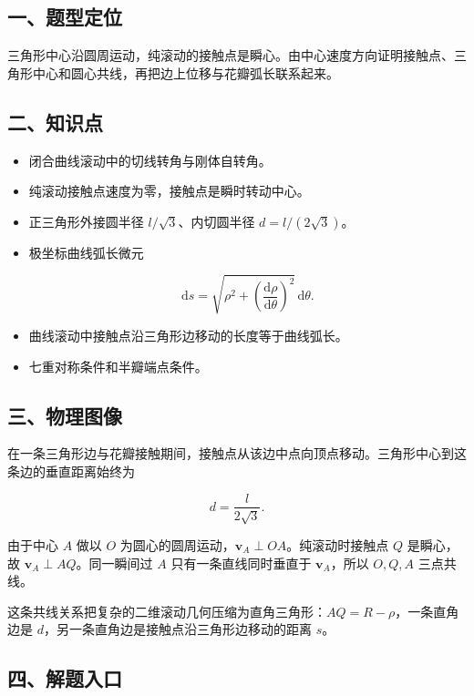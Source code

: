 \documentclass[12pt,a4paper,UTF8]{ctexart}
\begin{document}
\subsection{一、题型定位}\label{ux4e00ux9898ux578bux5b9aux4f4d-1}

三角形中心沿圆周运动，纯滚动的接触点是瞬心。由中心速度方向证明接触点、三角形中心和圆心共线，再把边上位移与花瓣弧长联系起来。

\subsection{二、知识点}\label{ux4e8cux77e5ux8bc6ux70b9-1}

\begin{itemize}
\item
  闭合曲线滚动中的切线转角与刚体自转角。
\item
  纯滚动接触点速度为零，接触点是瞬时转动中心。
\item
  正三角形外接圆半径 \(l/\sqrt3\)、内切圆半径 \(d=l/(2\sqrt3)\)。
\item
  极坐标曲线弧长微元

  \[\mathrm{d}s=\sqrt{\rho^2+\left(\frac{\mathrm{d}\rho}{\mathrm{d}\theta}\right)^2}\,\mathrm{d}\theta.\]
\item
  曲线滚动中接触点沿三角形边移动的长度等于曲线弧长。
\item
  七重对称条件和半瓣端点条件。
\end{itemize}

\subsection{三、物理图像}\label{ux4e09ux7269ux7406ux56feux50cf-1}

在一条三角形边与花瓣接触期间，接触点从该边中点向顶点移动。三角形中心到这条边的垂直距离始终为

\[d=\frac{l}{2\sqrt3}.\]

由于中心 \(A\) 做以 \(O\)
为圆心的圆周运动，\(\bm v_A\perp OA\)。纯滚动时接触点 \(Q\) 是瞬心，故
\(\bm v_A\perp AQ\)。同一瞬间过 \(A\) 只有一条直线同时垂直于
\(\bm v_A\)，所以 \(O,Q,A\) 三点共线。

这条共线关系把复杂的二维滚动几何压缩为直角三角形：\(AQ=R-\rho\)，一条直角边是
\(d\)，另一条直角边是接触点沿三角形边移动的距离 \(s\)。

\subsection{四、解题入口}\label{ux56dbux89e3ux9898ux5165ux53e3-1}
\end{document}
